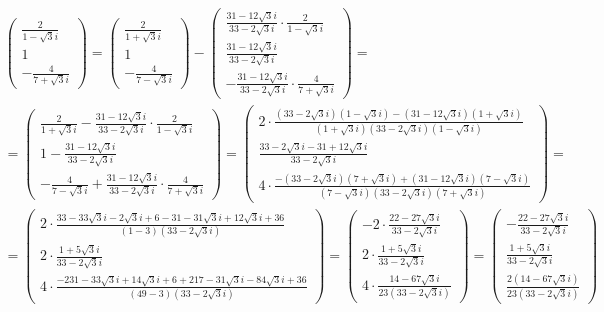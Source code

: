 \begin{multline*}
\begin{pmatrix}
        \frac2{1 - \sqrt3i} \\
        1 \\
        -\frac4{7 + \sqrt3i}
    \end{pmatrix} =
    \begin{pmatrix}
        \frac2{1 + \sqrt3i} \\
        1 \\
        -\frac4{7 - \sqrt3i}
    \end{pmatrix} -
    \begin{pmatrix}
        \frac{31 - 12\sqrt3i}{33 - 2\sqrt3i} \cdot \frac2{1 - \sqrt3i} \\
        \frac{31 - 12\sqrt3i}{33 - 2\sqrt3i} \\
        -\frac{31 - 12\sqrt3i}{33 - 2\sqrt3i} \cdot \frac4{7 + \sqrt3i}
    \end{pmatrix} = \\
    =
    \begin{pmatrix}
        \frac2{1 + \sqrt3i} - \frac{31 - 12\sqrt3i}{33 - 2\sqrt3i} \cdot \frac2{1 - \sqrt3i} \\
        1 - \frac{31 - 12\sqrt3i}{33 - 2\sqrt3i} \\
        -\frac4{7 - \sqrt3i} + \frac{31 - 12\sqrt3i}{33 - 2\sqrt3i} \cdot \frac4{7 + \sqrt3i}
    \end{pmatrix} =
    \begin{pmatrix}
        2 \cdot \frac{(33 - 2\sqrt3i)(1 - \sqrt3i) - (31 - 12\sqrt3i)(1 + \sqrt3i)}{(1 + \sqrt3i)(33 - 2\sqrt3i)(1 - \sqrt3i)} \\
        \frac{33 - 2\sqrt3i - 31 + 12\sqrt3i}{33 - 2\sqrt3i} \\
        4 \cdot \frac{-(33 - 2\sqrt3i)(7 + \sqrt3i) + (31 - 12\sqrt3i)(7 - \sqrt3i)}{(7 - \sqrt3i)(33 - 2\sqrt3i)(7 + \sqrt3i)}
    \end{pmatrix} = \\
    =
    \begin{pmatrix}
        2 \cdot \frac{33 - 33\sqrt3i - 2\sqrt3i + 6 - 31 - 31\sqrt3i + 12\sqrt3i + 36}{(1 - 3)(33 - 2\sqrt3i)} \\
        2 \cdot \frac{1 + 5\sqrt3i}{33 - 2\sqrt3i} \\
        4 \cdot \frac{-231 - 33\sqrt3i + 14\sqrt3i + 6 + 217 - 31\sqrt3i - 84\sqrt3i + 36}{(49 - 3)(33 - 2\sqrt3i)}
    \end{pmatrix} =
    \begin{pmatrix}
        -2 \cdot \frac{22 - 27\sqrt3i}{33 - 2\sqrt3i} \\
        2 \cdot \frac{1 + 5\sqrt3i}{33 - 2\sqrt3i} \\
        4 \cdot \frac{14 - 67\sqrt3i}{23(33 - 2\sqrt3i)}
    \end{pmatrix} =
    \begin{pmatrix}
    	-\frac{22 - 27\sqrt3i}{33 - 2\sqrt3i} \\
        \frac{1 + 5\sqrt3i}{33 - 2\sqrt3i} \\
        \frac{2(14 - 67\sqrt3i)}{23(33 - 2\sqrt3i)}
    \end{pmatrix}
\end{multline*}

